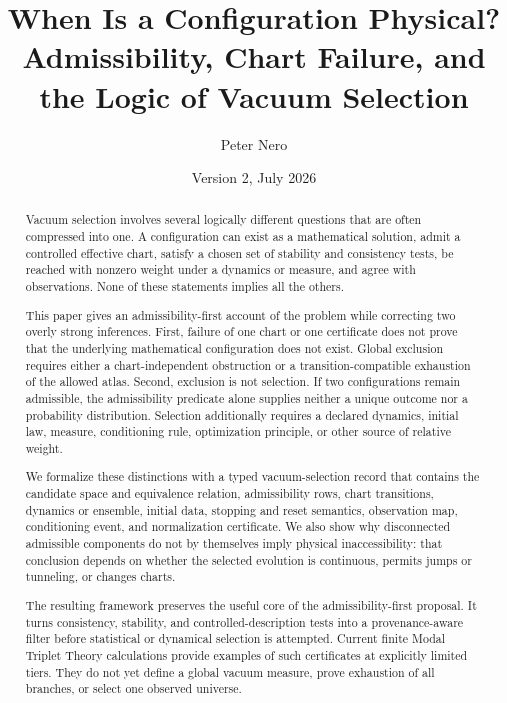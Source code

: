 \documentclass[11pt]{article}
\title{\vspace{-1em}
When Is a Configuration Physical?\\[0.25em]
\large Admissibility, Chart Failure, and the Logic of Vacuum Selection}
\author{Peter Nero}
\date{Version 2, July 2026}
\theoremstyle{definition}
\theoremstyle{remark}
\newcommand{\1}{\mathbf 1}
\newcommand{\MTT}{Modal Triplet Theory}
\begin{document}
\maketitle

\begin{abstract}
Vacuum selection involves several logically different questions that are
often compressed into one.  A configuration can exist as a mathematical
solution, admit a controlled effective chart, satisfy a chosen set of
stability and consistency tests, be reached with nonzero weight under a
dynamics or measure, and agree with observations.  None of these statements
implies all the others.

This paper gives an admissibility-first account of the problem while
correcting two overly strong inferences.  First, failure of one chart or one
certificate does not prove that the underlying mathematical configuration
does not exist.  Global exclusion requires either a chart-independent
obstruction or a transition-compatible exhaustion of the allowed atlas.
Second, exclusion is not selection.  If two configurations remain
admissible, the admissibility predicate alone supplies neither a unique
outcome nor a probability distribution.  Selection additionally requires a
declared dynamics, initial law, measure, conditioning rule, optimization
principle, or other source of relative weight.

We formalize these distinctions with a typed vacuum-selection record that
contains the candidate space and equivalence relation, admissibility rows,
chart transitions, dynamics or ensemble, initial data, stopping and reset
semantics, observation map, conditioning event, and normalization
certificate.  We also show why disconnected admissible components do not by
themselves imply physical inaccessibility: that conclusion depends on
whether the selected evolution is continuous, permits jumps or tunneling,
or changes charts.

The resulting framework preserves the useful core of the
admissibility-first proposal.  It turns consistency, stability, and
controlled-description tests into a provenance-aware filter before
statistical or dynamical selection is attempted.  Current finite
\MTT{} calculations provide examples of such certificates at explicitly
limited tiers.  They do not yet define a global vacuum measure, prove
exhaustion of all branches, or select one observed universe.
\end{abstract}
\end{document}

